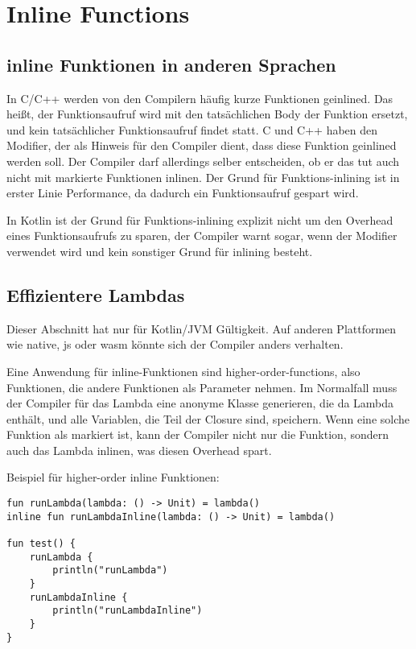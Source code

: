 
\section{Inline Functions}\label{sec:inline-functions}

\renewcommand{\kapitelautor}{Autor: Marvin Kurka}

\subsection{inline Funktionen in anderen Sprachen}
In C/C++ werden von den Compilern häufig kurze Funktionen geinlined.
Das heißt, der Funktionsaufruf wird mit den tatsächlichen Body der Funktion ersetzt, und kein tatsächlicher
Funktionsaufruf findet statt.
C und C++ haben den  Modifier, der als Hinweis für den Compiler dient, dass diese Funktion
geinlined werden soll.
Der Compiler darf allerdings selber entscheiden, ob er das tut \bzw auch nicht mit  markierte
Funktionen inlinen.
Der Grund für Funktions-inlining ist in erster Linie Performance, da dadurch ein Funktionsaufruf gespart wird.\cite{crefInline}

In Kotlin ist der Grund für Funktions-inlining explizit nicht um den Overhead eines Funktionsaufrufs zu sparen,
der Compiler warnt sogar, wenn der  Modifier verwendet wird und kein sonstiger Grund für
inlining besteht.

\subsection{Effizientere Lambdas}
Dieser Abschnitt hat nur für Kotlin/JVM Gültigkeit.
Auf anderen Plattformen wie native, js oder wasm könnte sich der Compiler anders verhalten.

Eine Anwendung für inline-Funktionen sind higher-order-functions, also Funktionen, die andere Funktionen als Parameter
nehmen.
Im Normalfall muss der Compiler für das Lambda eine anonyme Klasse generieren, die da Lambda enthält, und alle Variablen,
die Teil der Closure sind, speichern.
Wenn eine solche Funktion als  markiert ist, kann der Compiler nicht nur die Funktion, sondern auch
das Lambda inlinen, was diesen Overhead spart.

Beispiel für higher-order inline Funktionen:

\begin{verbatim}
fun runLambda(lambda: () -> Unit) = lambda()
inline fun runLambdaInline(lambda: () -> Unit) = lambda()

fun test() {
    runLambda {
        println("runLambda")
    }
    runLambdaInline {
        println("runLambdaInline")
    }
}
\end{verbatim}

